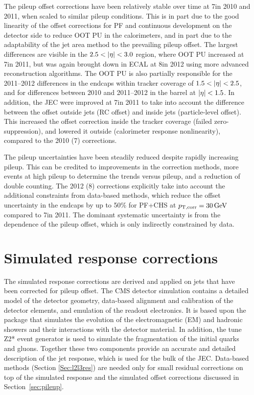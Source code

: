 \documentclass[11pt,twoside,a4paper,cmspaper,final,collab]{cms-tdr}
\begin{document}
The pileup offset corrections have been relatively stable over time at 7\TeV in 2010 and 2011, when scaled to similar pileup conditions.
This is in part due to the good linearity of the offset corrections for PF and continuous development on the detector side to reduce OOT PU in the calorimeters, and in part due to the adaptability of the jet area method to the prevailing pileup offset.
The largest differences are visible
in the $2.5<\lvert \eta \rvert<3.0$ region, where OOT PU increased at 7\TeV in 2011, but was again brought down in ECAL at 8\TeV in 2012 using more advanced reconstruction algorithms.
The OOT PU is also partially responsible for the 2011--2012 differences in the endcaps within tracker coverage of $1.5<\lvert \eta \rvert<2.5$, and for differences between 2010 and 2011--2012 in the barrel at $\lvert \eta \rvert<1.5$. In addition, the JEC were improved at 7\TeV in 2011 to take into account the difference between the offset outside jets (RC offset) and inside jets (particle-level offset). This increased the offset correction inside the tracker coverage (failed zero-suppression), and lowered it outside (calorimeter response nonlinearity), compared to the 2010 (7\TeV) corrections.

The pileup uncertainties
have been steadily reduced despite rapidly increasing pileup. This can be credited to improvements in the correction methods, more events at high pileup to determine the trends versus pileup, and a reduction of double counting. The 2012 (8\TeV) corrections explicitly take into account the additional constraints
from data-based methods,
which reduce the offset uncertainty in the endcaps by up to 50\% for PF+CHS at $p_{\mathrm{T},\rm corr}=30\,\text{Ge\hspace{-.08em}V}$ compared to 7\TeV in 2011. The dominant systematic uncertainty is from the \pt dependence of the pileup offset, which is only indirectly constrained by data.


\section{Simulated response corrections}
\label{sec:mctruth}

The simulated response corrections are derived and applied on jets that have been corrected for pileup offset.
The CMS detector simulation contains a detailed model of the detector geometry, data-based alignment and calibration of the detector elements, and emulation of the readout electronics. It is based upon the {\GEANTfour} package \cite{Agostinelli:2002hh} that simulates the evolution of the electromagnetic (EM) and hadronic showers and their interactions with the detector material. In addition, the  tune Z2* event generator is used to simulate the fragmentation of the initial quarks and gluons. Together these two components provide an accurate and detailed description of the jet response, which is used for the bulk of the JEC. Data-based methods (Section \ref{Sec:l2l3res}) are needed only for small residual corrections on top of the simulated response and the simulated offset corrections discussed in Section~\ref{sec:pileup}.
\end{document}
